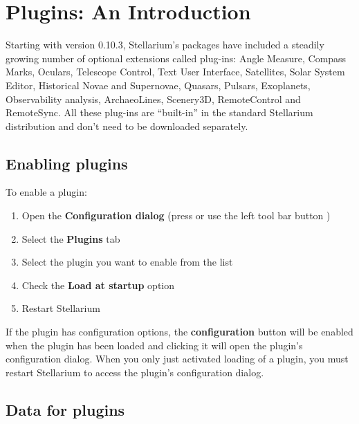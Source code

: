 
\chapter{Plugins: An Introduction}
\label{ch:Plugins}

Starting with version 0.10.3, Stellarium's packages have included a steadily growing number of
optional extensions called plug-ins: Angle Measure, Compass Marks, Oculars, Telescope Control, Text
User Interface, Satellites, Solar System Editor, Historical Novae and 
Supernovae, Quasars, Pulsars, Exoplanets, Observability analysis, ArchaeoLines, Scenery3D, 
RemoteControl and RemoteSync. All
these plug-ins are ``built-in'' in the standard Stellarium distribution
and don't need to be downloaded separately.


\section{Enabling plugins}
\label{sec:Plugins:EnablingPlugins}


To enable a plugin:

\begin{enumerate}
\item Open the \textbf{Configuration dialog} (press  or use
  the left tool bar button )
\item Select the \textbf{Plugins} tab
\item Select the plugin you want to enable from the list
\item Check the \textbf{Load at startup} option
\item Restart Stellarium
\end{enumerate}

\noindent If the plugin has configuration options, the
\textbf{configuration} button will be enabled when the plugin has been
loaded and clicking it will open the plugin's configuration
dialog. When you only just activated loading of a plugin, you must
restart Stellarium to access the plugin's configuration dialog.

\section{Data for plugins}
\label{sec:Plugins:DataForPlugins}

